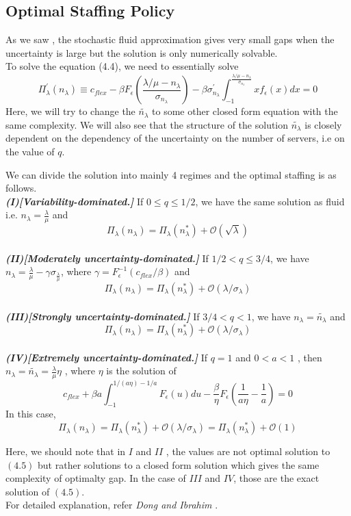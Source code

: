 \subsection{Optimal Staffing Policy}
As we saw , the stochastic fluid approximation gives very small gaps when the uncertainty is large but the solution is only numerically solvable. 
\\ To solve the equation (4.4), we need to essentially solve
\begin{equation}
    \Pi_\lambda^{'}(n_\lambda) \equiv c_{flex}-\beta F_{\epsilon}(\frac{\lambda/\mu-n_{\lambda}}{\sigma_{n_{\lambda}}})-\beta\sigma^{'}_{n_{\lambda}}\int_{-1}^{\frac{\lambda/\mu-n_{\lambda}}{\sigma_{n_{\lambda}}}}xf_{\epsilon}(x)dx=0
\end{equation}
Here, we will try to change the $\tilde{n_\lambda}$ to some other closed form equation with the same complexity. We will also see that the structure of the solution $\tilde{n_\lambda}$ is closely dependent on the dependency of the uncertainty on the number of servers, i.e on the value of $q$. 

\begin{theorem}
We can divide the solution into mainly 4 regimes and the optimal staffing is as follows.
\\\textbf{\textit{(I)[Variability-dominated.]}} If $0\leq q \leq 1/2$, we have the same solution as fluid i.e. ${n_\lambda}=\frac{\lambda}{\mu}$ and $$\Pi_\lambda({n_\lambda})=\Pi_\lambda(n_\lambda^{*})+\mathcal{O}(\sqrt{\lambda})$$
\\\textbf{\textit{(II)[Moderately uncertainty-dominated.]}} If $1/2 < q \leq 3/4 $, we have ${n_\lambda}=\frac{\lambda}{\mu}-\gamma\sigma_{\frac{\lambda}{\mu}}$, where $\gamma = F_{\epsilon}^{-1}(c_{flex}/\beta)$ and
$$\Pi_\lambda({n_\lambda})=\Pi_\lambda(n_\lambda^{*})+\mathcal{O}(\lambda/\sigma_\lambda)$$
\\\textbf{\textit{(III)[Strongly uncertainty-dominated.]}} If $3/4 < q < 1 $, we have $n_\lambda = \tilde{n_\lambda}$ and
$$\Pi_\lambda({n_\lambda})=\Pi_\lambda(n_\lambda^{*})+\mathcal{O}(\lambda/\sigma_\lambda)$$
\\\textbf{\textit{(IV)[Extremely uncertainty-dominated.]}} If $q=1$ and $ 0 < a <1$ , then $n_\lambda= \tilde{n_\lambda} = \frac{\lambda}{\mu}\eta$ , where $\eta$ is the solution of 
$$c_{flex}+\beta a \int_{-1}^{1/(a\eta)-1/a}{F_\epsilon(u)du}-\frac{\beta}{\eta}F_\epsilon(\frac{1}{a\eta}-\frac{1}{a})=0$$
In this case,
$$\Pi_\lambda({n_\lambda})=\Pi_\lambda(n_\lambda^{*})+\mathcal{O}(\lambda/\sigma_\lambda)=\Pi_\lambda(n_\lambda^{*})+\mathcal{O}(1)$$
\end{theorem}
Here, we should note that in $I$ and $II$ , the values are not optimal solution to $(4.5)$ but rather solutions to a closed form solution which gives the same complexity of optimalty gap. In the case of $III$ and $IV$, those are the exact solution of $(4.5)$. \\

For detailed explanation, refer \textit{Dong and Ibrahim} \cite{dong}.